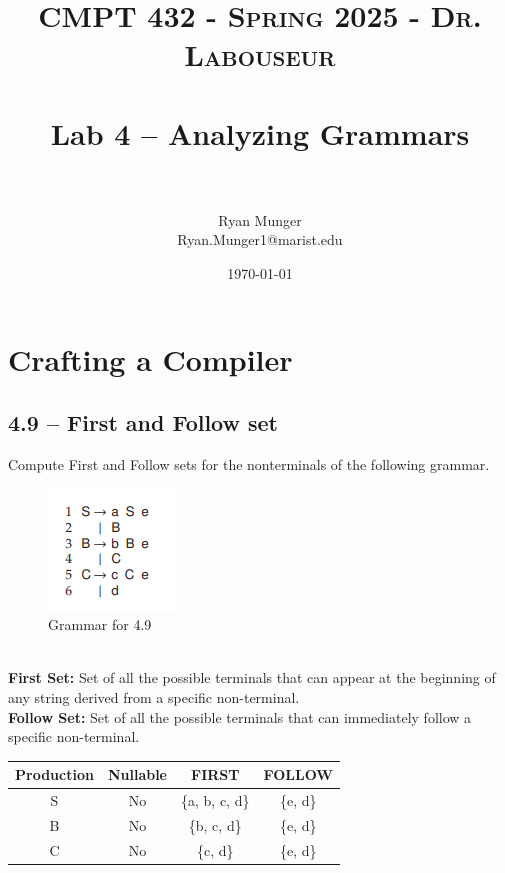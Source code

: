 \documentclass[letterpaper, 10pt]{article}
\title{	
   \normalfont \normalsize 
   \textsc{CMPT 432 - Spring 2025 - Dr. Labouseur} \\[10pt] %
   \horrule{0.5pt} \\[0.25cm] 	%
   \huge Lab 4 -- Analyzing Grammars \\     	    %
   \horrule{0.5pt} \\[0.25cm] 	%
}
\author{Ryan Munger \\ \normalsize Ryan.Munger1@marist.edu}
\date{\normalsize\today} 	%
\begin{document}
\maketitle %


\section{Crafting a Compiler}
\subsection{4.9	-- First and Follow set}
Compute First and Follow sets for the nonterminals of the following grammar.
\begin{figure} [h]
    \centering
    \includegraphics[width=0.3\linewidth]{4-9_grammar.png}
    \caption{Grammar for 4.9}
    \label{fig:enter-label}
\end{figure} \\
\textbf{First Set:} Set of all the possible terminals that can appear at the beginning of any string derived from a specific non-terminal. \\
\textbf{Follow Set:} Set of all the possible terminals that can immediately follow a specific non-terminal.
\begin{center}
\begin{table}[h]
\begin{tabular}{|c|c|c|c|}
\hline
\textbf{Production} & \textbf{Nullable} & \textbf{FIRST} & \textbf{FOLLOW} \\
\hline
    S & No & \{a, b, c, d\} & \{e, d\} \\
    B & No & \{b, c, d\} & \{e, d\} \\
    C & No & \{c, d\} & \{e, d\}\\
\hline
\end{tabular}
\end{table}
\end{center}
\end{document}
